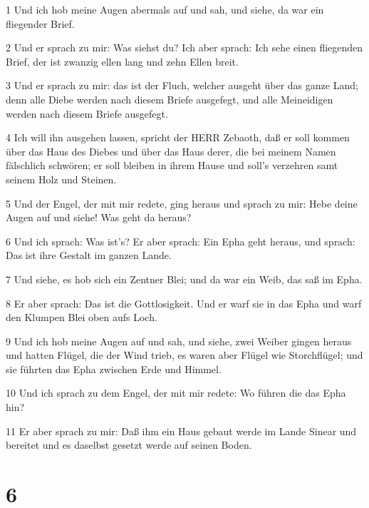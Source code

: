 \par 1 Und ich hob meine Augen abermals auf und sah, und siehe, da war ein fliegender Brief.
\par 2 Und er sprach zu mir: Was siehst du? Ich aber sprach: Ich sehe einen fliegenden Brief, der ist zwanzig ellen lang und zehn Ellen breit.
\par 3 Und er sprach zu mir: das ist der Fluch, welcher ausgeht über das ganze Land; denn alle Diebe werden nach diesem Briefe ausgefegt, und alle Meineidigen werden nach diesem Briefe ausgefegt.
\par 4 Ich will ihn ausgehen lassen, spricht der HERR Zebaoth, daß er soll kommen über das Haus des Diebes und über das Haus derer, die bei meinem Namen fälschlich schwören; er soll bleiben in ihrem Hause und soll's verzehren samt seinem Holz und Steinen.
\par 5 Und der Engel, der mit mir redete, ging heraus und sprach zu mir: Hebe deine Augen auf und siehe! Was geht da heraus?
\par 6 Und ich sprach: Was ist's? Er aber sprach: Ein Epha geht heraus, und sprach: Das ist ihre Gestalt im ganzen Lande.
\par 7 Und siehe, es hob sich ein Zentner Blei; und da war ein Weib, das saß im Epha.
\par 8 Er aber sprach: Das ist die Gottlosigkeit. Und er warf sie in das Epha und warf den Klumpen Blei oben aufs Loch.
\par 9 Und ich hob meine Augen auf und sah, und siehe, zwei Weiber gingen heraus und hatten Flügel, die der Wind trieb, es waren aber Flügel wie Storchflügel; und sie führten das Epha zwischen Erde und Himmel.
\par 10 Und ich sprach zu dem Engel, der mit mir redete: Wo führen die das Epha hin?
\par 11 Er aber sprach zu mir: Daß ihm ein Haus gebaut werde im Lande Sinear und bereitet und es daselbst gesetzt werde auf seinen Boden.

\chapter{6}

